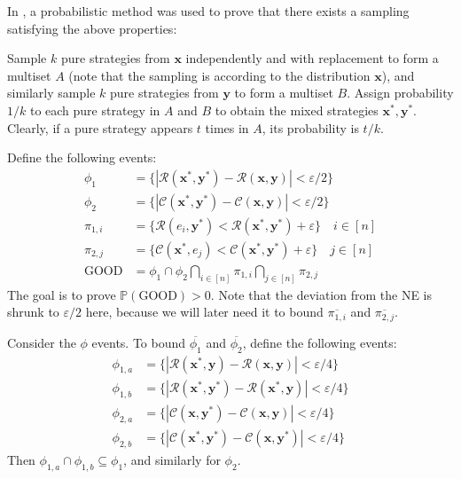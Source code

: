 In \cite{lmm03}, a probabilistic method was used to prove that there exists a sampling satisfying the above properties:

Sample $k$ pure strategies from $\mathbf{x}$ independently and with replacement to form a multiset $A$ (note that the sampling is according to the distribution $\mathbf{x}$), and similarly sample $k$ pure strategies from $\mathbf{y}$ to form a multiset $B$. Assign probability $1/k$ to each pure strategy in $A$ and $B$ to obtain the mixed strategies $\mathbf{x}^*, \mathbf{y}^*$. Clearly, if a pure strategy appears $t$ times in $A$, its probability is $t / k$.

Define the following events:
\begin{align*}
  \phi_1      & = \{ |\mathcal{R}(\mathbf{x}^*, \mathbf{y}^*) - \mathcal{R}(\mathbf{x}, \mathbf{y})| < \varepsilon/2 \}        \\
  \phi_2      & = \{ |\mathcal{C}(\mathbf{x}^*, \mathbf{y}^*) - \mathcal{C}(\mathbf{x}, \mathbf{y})| < \varepsilon/2 \}        \\
  \pi_{1, i}  & = \{ \mathcal{R}(e_i, \mathbf{y}^*) < \mathcal{R}(\mathbf{x}^*, \mathbf{y}^*) + \varepsilon \} \quad i \in [n] \\
  \pi_{2, j}  & = \{ \mathcal{C}(\mathbf{x}^*, e_j) < \mathcal{C}(\mathbf{x}^*, \mathbf{y}^*) + \varepsilon \} \quad j \in [n] \\
  \text{GOOD} & = \phi_1 \cap \phi_2 \bigcap_{i \in [n]} \pi_{1, i} \bigcap_{j \in [n]} \pi_{2, j}
\end{align*}
The goal is to prove $\mathbb{P}(\text{GOOD}) > 0$. Note that the deviation from the NE is shrunk to $\varepsilon / 2$ here, because we will later need it to bound $\overline{\pi_{1, i}}$ and $\overline{\pi_{2, j}}$.

Consider the $\phi$ events. To bound $\overline{\phi_1}$ and $\overline{\phi_2}$, define the following events:
\begin{align*}
  \phi_{1, a} & = \{ |\mathcal{R}(\mathbf{x}^*, \mathbf{y}) - \mathcal{R}(\mathbf{x}, \mathbf{y})| < \varepsilon/4 \}     \\
  \phi_{1, b} & = \{ |\mathcal{R}(\mathbf{x}^*, \mathbf{y}^*) - \mathcal{R}(\mathbf{x}^*, \mathbf{y})| < \varepsilon/4 \} \\
  \phi_{2, a} & = \{ |\mathcal{C}(\mathbf{x}, \mathbf{y}^*) - \mathcal{C}(\mathbf{x}, \mathbf{y})| < \varepsilon/4 \}     \\
  \phi_{2, b} & = \{ |\mathcal{C}(\mathbf{x}^*, \mathbf{y}^*) - \mathcal{C}(\mathbf{x}, \mathbf{y}^*)| < \varepsilon/4 \}
\end{align*}
Then $\phi_{1, a} \cap \phi_{1, b} \subseteq \phi_1$, and similarly for $\phi_2$.

